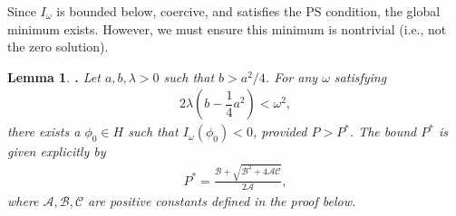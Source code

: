 \documentclass[12pt]{article}
\newtheorem{oldlemma}[oldtheorem]{Lemma}
\newenvironment{lemma}{\begin{oldlemma}$\!\!\!${\bf.}}{\end{oldlemma}}
\begin{document}
	Since $I_{\omega}$ is bounded below, coercive, and satisfies the PS condition, the global minimum exists. However, we must ensure this minimum is nontrivial (i.e., not the zero solution).
	
	\begin{lemma}
		Let $a,b,\lambda > 0$ such that $b > a^2/4$. For any $\omega$ satisfying
		\begin{align}
			2\lambda\left(b-\dfrac{1}{4}a^2\right)<\omega^2, \label{neccCond3}
		\end{align}
		there exists a $\phi_0\in H$ such that $I_{\omega}(\phi_0)<0$, provided $P > P^*$. The bound $P^*$ is given explicitly by
		\begin{align}
			P^* = \frac{\mathcal{B} + \sqrt{\mathcal{B}^2 + 4 \mathcal{A} \mathcal{C}}}{2\mathcal{A}},
		\end{align}
		where $\mathcal{A}, \mathcal{B}, \mathcal{C}$ are positive constants defined in the proof below.
	\end{lemma}
	
\end{document}
